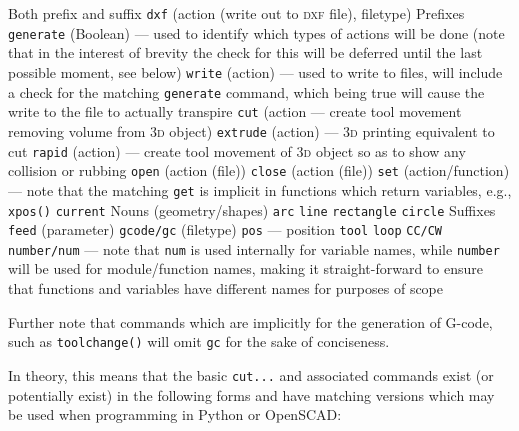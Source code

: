 \documentclass{ltxdoc}
\begin{document}
\begin{outline}
\1 Both prefix and suffix
\2 \texttt{dxf} (action (write out to \textsc{dxf} file), filetype)
\1 Prefixes
\2 \texttt{generate} (Boolean) --- used to identify which types of actions will be done (note that in the interest of brevity the check for this will be deferred until the last possible moment, see below)
\2 \texttt{write} (action) --- used to write to files, will include a check for the matching \texttt{generate} command, which being true will cause the write to the file to actually transpire 
\2 \texttt{cut} (action --- create tool movement removing volume from \textsc{3d} object)
\2 \texttt{extrude} (action) --- \textsc{3d} printing equivalent to cut
\2 \texttt{rapid} (action) --- create tool movement of \textsc{3d} object so as to show any collision or rubbing
\2 \texttt{open} (action (file))
\2 \texttt{close} (action (file))
\2 \texttt{set} (action/function) --- note that the matching \verb|get| is implicit in functions which return variables, e.g., \verb|xpos()|
\2 \texttt{current}
\1 Nouns (geometry/shapes)
\2 \texttt{arc}
\2 \texttt{line}
\2 \texttt{rectangle}
\2 \texttt{circle}
\1 Suffixes
\2 \texttt{feed} (parameter)
\2 \texttt{gcode/gc} (filetype)
\2 \texttt{pos} --- position
\2 \texttt{tool}
\2 \texttt{loop}
\2 \texttt{CC/CW}
\2 \texttt{number/num} --- note that \verb|num| is used internally for variable names, while \verb|number| will be used for module/function names, making it straight-forward to ensure that functions and variables have different names for purposes of scope
\end{outline}

\noindent Further note that commands which are implicitly for the generation of G-code, such as \verb|toolchange()| will omit \verb|gc| for the sake of conciseness.

In theory, this means that the basic \verb|cut...| and associated commands exist (or potentially exist) in the following forms and have matching versions which may be used when programming in Python or OpenSCAD:
\end{document}
